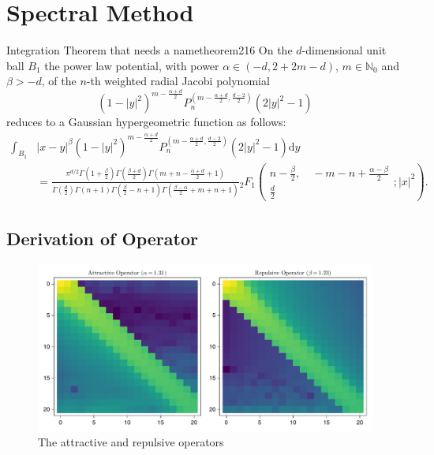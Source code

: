 \chapter{Spectral Method}
\label{chap:spectral-method}

\begin{theorem}{Integration Theorem that needs a name}{theorem216}
  On the $d$-dimensional unit ball $B_1$ the power law potential, with power $\alpha \in(-d,2+2m-d)$, $m\in\mathbb{N}_0$ and $\beta>-d$, of the $n$-th weighted radial Jacobi polynomial $$(1-|y|^2)^{m-\frac{\alpha+d}{2}}P_n^{(m-\frac{\alpha+d}{2},\frac{d-2}{2})}(2|y|^2-1)$$ reduces to a Gaussian hypergeometric function as follows:
  \begin{align*}
    \int_{B_1} & |x-y|^\beta (1-|y|^2)^{m-\frac{\alpha+d}{2}} P_n^{(m-\frac{\alpha+d}{2},\frac{d-2}{2})}(2|y|^2-1) \mathrm{d}y                                                                                                                                                                                                                                                                                               \\
               & = \tfrac{\pi ^{d/2} \Gamma \left(1+\frac{\beta}{2}\right) \Gamma \left(\frac{\beta+d}{2}\right) \Gamma \left(m+n-\frac{\alpha+d}{2}+1\right)}{\Gamma \left(\frac{d}{2}\right) \Gamma (n+1) \Gamma \left(\frac{\beta}{2}-n+1\right) \Gamma \left(\frac{\beta-\alpha}{2}+m+n+1\right)}{}_2F_1\left(\begin{matrix}n-\frac{\beta}{2}, \quad -m-n+\frac{\alpha-\beta}{2} \\\frac{d}{2}\end{matrix};|x|^2\right).
  \end{align*}
\end{theorem}

\section{Derivation of Operator}


\begin{figure}[H]
  \centering
  \label{fig:attractive-repulsive}
  \includegraphics[width=\linewidth]{../figures/results/attractive-repulsive-operator.pdf}
  \caption{The attractive and repulsive operators}
\end{figure}
